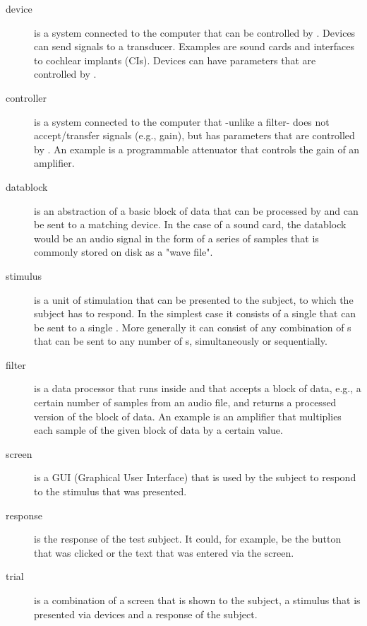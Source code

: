 \begin{description}
 

\item[device] is a system connected to the computer that can be
controlled by \apex. Devices can send signals to a transducer.
Examples are sound cards and interfaces to cochlear implants
(CIs).  Devices can have parameters that are controlled by \apex.

\item[controller] is a system connected to the computer that
-unlike a filter- does not accept/transfer signals (e.g., gain), but
has parameters that are controlled by \apex. An example is a
programmable attenuator that controls the gain of an amplifier.

\item[datablock] is an abstraction of a basic block of data that
can be processed by \apex and can be sent to a matching device. In
the case of a sound card, the datablock would be an audio signal
in the form of a series of samples that is commonly stored on disk
as a "wave file". \item[stimulus] is a unit of stimulation that
can be presented to the subject, to which the subject has to
respond. In the simplest case it consists of a single
 that can be sent to a single .
More generally it can consist of any combination of
s that can be sent to any number of
s, simultaneously or sequentially. 

\item[filter]
is a data processor that runs inside \apex and that accepts a
block of data, e.g., a certain number of samples from an audio
file, and returns a processed version of the block of data. An
example is an amplifier that multiplies each sample of the given
block of data by a certain value. 

\item[screen] is a GUI
(Graphical User Interface) that is used by the subject to respond
to the stimulus that was presented. 

\item[response] is the
response of the test subject. It could, for example, be the button
that was clicked or the text that was entered via the screen.

\item[trial] is a combination of a screen that is shown to the
subject, a stimulus that is presented via devices and a response
of the subject. 


\end{description}
